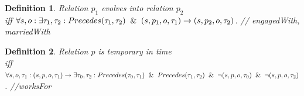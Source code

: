 \documentclass[letterpaper]{article} %
\newtheorem{definition}{Definition}
\begin{document}
\begin{definition}
Relation $p_1$ evolves into relation  $p_2$
\\ iff $ \forall s,o: \exists  \tau_1, \tau_2: Precedes(\tau_1, \tau_2) \And (s,p_1, o, \tau_1) \rightarrow (s,p_2, o, \tau_2)$. \hfill // engagedWith, marriedWith
\label{evolvepattern}
\end{definition}


\begin{definition}\label{temprelationt1t2}
Relation $p$ is temporary in time \\ iff 
 $ \forall s,o, \tau_1: (s,p, o, \tau_1) \rightarrow \exists \tau_0, \tau_2: Precedes(\tau_0, \tau_1) \And Precedes(\tau_1, \tau_2)   \And \neg (s,p, o, \tau_0)  \And \neg (s,p, o, \tau_2)$. \hfill //worksFor 
\end{definition} 



\end{document}
